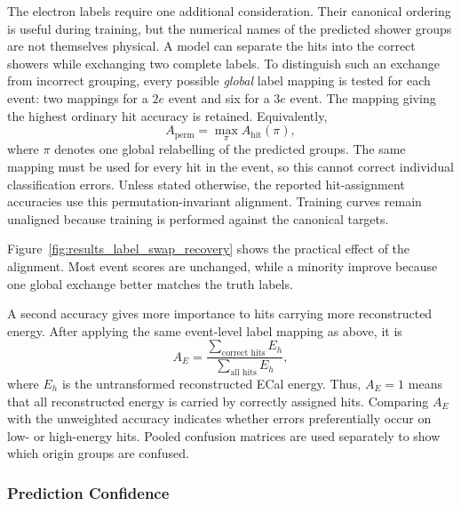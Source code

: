The electron labels require one additional consideration. Their canonical
ordering is useful during training, but the numerical names of the predicted
shower groups are not themselves physical. A model can separate the hits into
the correct showers while exchanging two complete labels. To distinguish
such an exchange from incorrect grouping, every possible \emph{global} label
mapping is tested for each event: two mappings for a \(2e\) event and six for
a \(3e\) event. The mapping giving the highest ordinary hit accuracy is
retained. Equivalently,
\begin{equation}
    A_{\mathrm{perm}}
    =
    \max_{\pi} A_{\mathrm{hit}}(\pi),
    \label{eq:event_permutation_accuracy}
\end{equation}
where \(\pi\) denotes one global relabelling of the predicted groups. The same
mapping must be used for every hit in the event, so this cannot correct
individual classification errors. Unless stated otherwise, the reported
hit-assignment accuracies use this permutation-invariant alignment. Training
curves remain unaligned because training is performed against the canonical
targets.

Figure~\ref{fig:results_label_swap_recovery} shows the practical effect of the
alignment. Most event scores are unchanged, while a minority improve because
one global exchange better matches the truth labels.

A second accuracy gives more importance to hits carrying more reconstructed
energy. After applying the same event-level label mapping as above, it is
\begin{equation}
    A_E
    =
    \frac{\sum_{\text{correct hits}} E_h}
         {\sum_{\text{all hits}} E_h},
    \label{eq:event_energy_weighted_accuracy}
\end{equation}
where \(E_h\) is the untransformed reconstructed ECal energy. Thus,
\(A_E=1\) means that all reconstructed energy is carried by correctly assigned
hits. Comparing \(A_E\) with the unweighted accuracy indicates whether errors
preferentially occur on low- or high-energy hits. Pooled confusion matrices
are used separately to show which origin groups are confused.

\subsubsection{Prediction Confidence}

